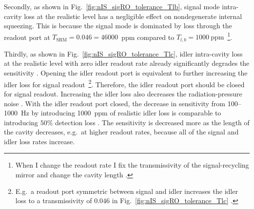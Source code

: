 Secondly, as shown in Fig.~\ref{fig:nIS_sigRO_tolerance_Tlb}, signal mode intra-cavity loss at the realistic level has a negligible  effect on nondegenerate internal squeezing. This is because the signal mode is dominated by loss through the readout port at $T_\text{SRM}=0.046=46000$~ppm compared to $T_{l,b}=1000~\text{ppm}$~\footnote{When I change the readout rate I fix the transmissivity of the signal-recycling mirror and change the cavity length .}. %

Thirdly, as shown in Fig.~\ref{fig:nIS_sigRO_tolerance_Tlc}, idler intra-cavity loss at the realistic level with zero idler readout rate already significantly degrades the sensitivity . Opening the idler readout port is equivalent to further increasing the idler loss for signal readout~\footnote{E.g.\ a readout port symmetric between signal and idler increases the idler loss to a transmissivity of $0.046$ in Fig.~\ref{fig:nIS_sigRO_tolerance_Tlc} .}. Therefore, the idler readout port should be closed for signal readout. Increasing the idler loss also decreases the radiation-pressure noise . With the idler readout port closed, the decrease in sensitivity from 100--1000~Hz by introducing 1000~ppm of realistic idler loss is comparable to introducing $50\%$ detection loss . The sensitivity is decreased more as the length of the cavity decreases, e.g.\ at higher readout rates, because all of the signal and idler loss rates increase. 

